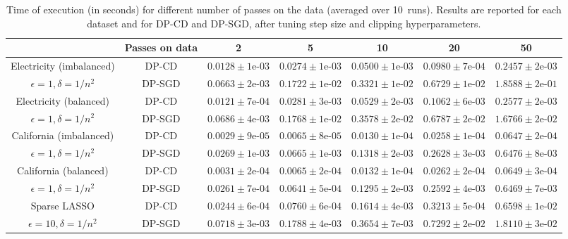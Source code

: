 \begin{table}[H]
  \centering
  \scriptsize

  \caption{ Time of execution (in seconds) for different number of
    passes on the data (averaged over 10~runs). Results are reported
    for each dataset and for DP-CD and DP-SGD, after tuning step size
    and clipping hyperparameters.
  }

  \label{tab:full-tuning-runtime}
  \begin{tabular}{ccccccc}
    \toprule
    & Passes on data &2  	 &5  	 &10  	 &20  	 &50  	 \\
    \midrule
    Electricity (imbalanced) & DP-CD & $ 0.0128 \pm 1\text{e-}03 $ 	 & $ 0.0274 \pm 1\text{e-}03 $ 	 & $ 0.0500 \pm 1\text{e-}03 $ 	 & $ 0.0980 \pm 7\text{e-}04 $ 	 & $ 0.2457 \pm 2\text{e-}03 $ 	 \\
    $\epsilon = 1, \delta=1/n^2$ & DP-SGD & $ 0.0663 \pm 2\text{e-}03 $ 	 & $ 0.1722 \pm 1\text{e-}02 $ 	 & $ 0.3321 \pm 1\text{e-}02 $ 	 & $ 0.6729 \pm 1\text{e-}02 $ 	 & $ 1.8588 \pm 2\text{e-}01 $ 	 \\
    \midrule
    Electricity (balanced) & DP-CD & $ 0.0121 \pm 7\text{e-}04 $ 	 & $ 0.0281 \pm 3\text{e-}03 $ 	 & $ 0.0529 \pm 2\text{e-}03 $ 	 & $ 0.1062 \pm 6\text{e-}03 $ 	 & $ 0.2577 \pm 2\text{e-}03 $ 	 \\
    $\epsilon = 1, \delta=1/n^2$ & DP-SGD & $ 0.0686 \pm 4\text{e-}03 $ 	 & $ 0.1768 \pm 1\text{e-}02 $ 	 & $ 0.3578 \pm 2\text{e-}02 $ 	 & $ 0.6787 \pm 2\text{e-}02 $ 	 & $ 1.6766 \pm 2\text{e-}02 $ 	 \\
    \midrule
    California (imbalanced) & DP-CD & $ 0.0029 \pm 9\text{e-}05 $ 	 & $ 0.0065 \pm 8\text{e-}05 $ 	 & $ 0.0130 \pm 1\text{e-}04 $ 	 & $ 0.0258 \pm 1\text{e-}04 $ 	 & $ 0.0647 \pm 2\text{e-}04 $ 	 \\
    $\epsilon = 1, \delta=1/n^2$ & DP-SGD & $ 0.0269 \pm 1\text{e-}03 $ 	 & $ 0.0665 \pm 1\text{e-}03 $ 	 & $ 0.1318 \pm 2\text{e-}03 $ 	 & $ 0.2628 \pm 3\text{e-}03 $ 	 & $ 0.6476 \pm 8\text{e-}03 $ 	 \\
    \midrule
    California (balanced) & DP-CD & $ 0.0031 \pm 2\text{e-}04 $ 	 & $ 0.0065 \pm 2\text{e-}04 $ 	 & $ 0.0132 \pm 1\text{e-}04 $ 	 & $ 0.0262 \pm 2\text{e-}04 $ 	 & $ 0.0649 \pm 3\text{e-}04 $ 	 \\
    $\epsilon = 1, \delta=1/n^2$ & DP-SGD & $ 0.0261 \pm 7\text{e-}04 $ 	 & $ 0.0641 \pm 5\text{e-}04 $ 	 & $ 0.1295 \pm 2\text{e-}03 $ 	 & $ 0.2592 \pm 4\text{e-}03 $ 	 & $ 0.6469 \pm 7\text{e-}03 $ 	 \\
    \midrule
    Sparse LASSO & DP-CD & $ 0.0244 \pm 6\text{e-}04 $ 	 & $ 0.0760 \pm 6\text{e-}04 $ 	 & $ 0.1614 \pm 4\text{e-}03 $ 	 & $ 0.3213 \pm 5\text{e-}04 $ 	 & $ 0.6598 \pm 1\text{e-}02 $ 	 \\
    $\epsilon = 10, \delta=1/n^2$ & DP-SGD & $ 0.0718 \pm 3\text{e-}03 $ 	 & $ 0.1788 \pm 4\text{e-}03 $ 	 & $ 0.3654 \pm 7\text{e-}03 $ 	 & $ 0.7292 \pm 2\text{e-}02 $ 	 & $ 1.8110 \pm 3\text{e-}02 $ 	 \\
    \bottomrule
  \end{tabular}
\end{table}


